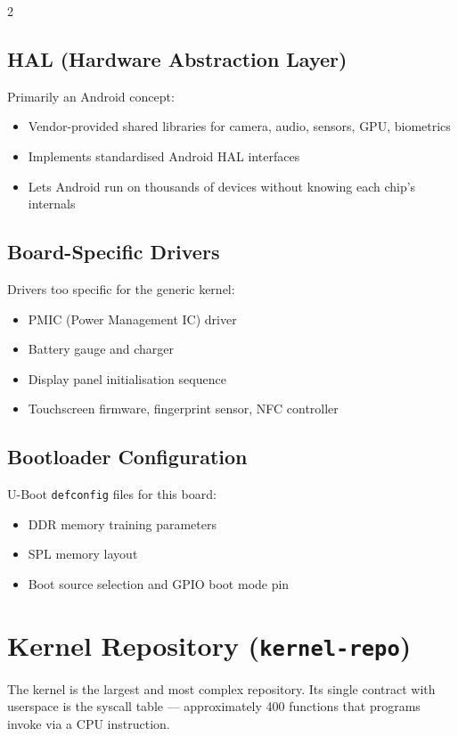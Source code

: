 2\documentclass[11pt,a4paper]{article}
\begin{document}
\subsection{HAL (Hardware Abstraction Layer)}
Primarily an Android concept:
\begin{itemize}[noitemsep]
  \item Vendor-provided shared libraries for camera, audio, sensors, GPU, biometrics
  \item Implements standardised Android HAL interfaces
  \item Lets Android run on thousands of devices without knowing each chip's internals
\end{itemize}

\subsection{Board-Specific Drivers}
Drivers too specific for the generic kernel:
\begin{itemize}[noitemsep]
  \item PMIC (Power Management IC) driver
  \item Battery gauge and charger
  \item Display panel initialisation sequence
  \item Touchscreen firmware, fingerprint sensor, NFC controller
\end{itemize}

\subsection{Bootloader Configuration}
U-Boot \texttt{defconfig} files for this board:
\begin{itemize}[noitemsep]
  \item DDR memory training parameters
  \item SPL memory layout
  \item Boot source selection and GPIO boot mode pin
\end{itemize}

\section{Kernel Repository (\texttt{kernel-repo})}

The kernel is the largest and most complex repository. Its single contract with userspace is the syscall table --- approximately 400 functions that programs invoke via a CPU instruction.
\end{document}
